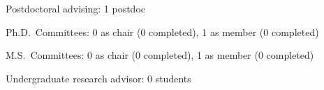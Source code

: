 \begin{tightItemize}
    \item Postdoctoral advising: 1 postdoc
    \item Ph.D.\ Committees: 0 as chair (0 completed), 1 as member (0 completed)
    \item M.S.\ Committees:  0 as chair (0 completed), 1 as member (0 completed)
    \item Undergraduate research advisor: 0 students
\end{tightItemize}
